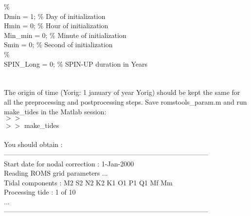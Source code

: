 \%\\
Dmin          = 1;                  \% Day of initialization\\
Hmin          = 0;                  \% Hour of initialization\\
Min\_min       = 0;                  \% Minute of initialization\\
Smin          = 0;                  \% Second of initialization\\
\%\\
SPIN\_Long     = 0;                  \% SPIN-UP duration in Years\\
\\\\
The origin of time (Yorig: 1 january of year Yorig) should be kept the same
for all the preprocessing and postprocessing steps.
Save romstools\_param.m and run make\_tides in the Matlab session:
\\
$>>$\\
$>>$ make\_tides\\\\
You should obtain :\\
------------------------------------------------------------------------------------------\\
Start date for nodal correction : 1-Jan-2000\\
Reading ROMS grid parameters ...\\
Tidal components : M2 S2 N2 K2 K1 O1 P1 Q1 Mf Mm \\
Processing tide : 1 of 10\\
...\\
------------------------------------------------------------------------------------------\\
